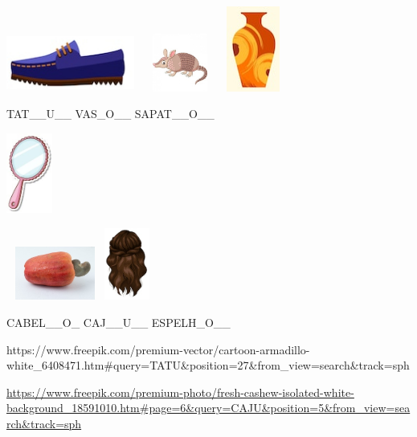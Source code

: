 {\includegraphics[width=1.65486in,height=0.74499in]{media/image34.jpeg}
\includegraphics[width=1.09512in,height=0.74522in]{media/image35.jpeg}
\includegraphics[width=0.69978in,height=1.10152in]{media/image36.jpeg}

TAT\_\_U\_\_ VAS\_O\_\_ SAPAT\_\_O\_\_

\includegraphics[width=0.59861in,height=1.03542in]{media/image37.jpeg}

\includegraphics[width=1.26250in,height=0.68750in]{media/image38.jpeg}\includegraphics[width=0.59873in,height=0.93296in]{media/image39.jpeg}

CABEL\_\_O\_ CAJ\_\_U\_\_ ESPELH\_O\_\_

https://www.freepik.com/premium-vector/cartoon-armadillo-white\_6408471.htm\#query=TATU\&position=27\&from\_view=search\&track=sph

\url{https://www.freepik.com/premium-photo/fresh-cashew-isolated-white-background_18591010.htm\#page=6\&query=CAJU\&position=5\&from_view=search\&track=sph}

}
